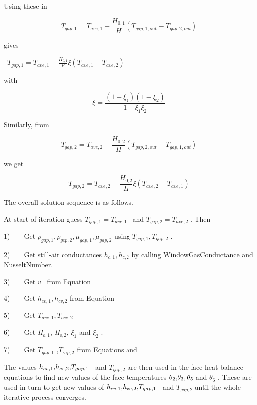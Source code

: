 Using these in

\begin{equation}
{T_{gap,1}} = {T_{ave,1}} - \frac{{{H_{0,1}}}}{H}\left( {{T_{gap,1,out}} - {T_{gap,2,out}}} \right)
\end{equation}

gives

~\({T_{gap,1}} = {T_{ave,1}} - \frac{{{H_{0,1}}}}{H}\xi \left( {{T_{ave,1}} - {T_{ave,2}}} \right)\)

with

\begin{equation}
\xi  = \frac{{(1 - {\xi_1})(1 - {\xi_2})}}{{1 - {\xi_1}{\xi_2}}}
\end{equation}

Similarly, from

\begin{equation}
{T_{gap,2}} = {T_{ave,2}} - \frac{{{H_{0,2}}}}{H}\left( {{T_{gap,2,out}} - {T_{gap,1,out}}} \right)
\end{equation}

we get

\begin{equation}
{T_{gap,2}} = {T_{ave,2}} - \frac{{{H_{0,2}}}}{H}\xi \left( {{T_{ave,2}} - {T_{ave,1}}} \right)
\end{equation}

The overall solution sequence is as follows.

At start of iteration guess \({T_{gap,1}} = {T_{ave,1}}\) ~and \({T_{gap,2}} = {T_{ave,2}}\) . Then

1)~~~~Get \({\rho_{gap,1}},{\rho_{gap,2}},{\mu_{gap,1}},{\mu_{gap,2}}\) using \({T_{gap,1}},{T_{gap,2}}\) .

2)~~~~Get still-air conductances \({h_{c,1}},{h_{c,2}}\) by calling WindowGasConductance and NusseltNumber.

3)~~~~Get \(v\) ~from Equation

4)~~~~Get \({h_{cv,1}},{h_{cv,2}}\) from Equation

5)~~~~Get \({T_{ave,1}},{T_{ave,2}}\)

6)~~~~Get \emph{H\(_{o,1}\)}, \emph{H\(_{o,2}\)}, \({\xi_1}\) and \({\xi_2}\) .

7)~~~~Get \({T_{gap,1}}\) ,\({T_{gap,2}}\) from Equations and

The values \({h_{cv,1}}{\rm{, }}{h_{cv,2}}{\rm{, }}{T_{gap,1}}\) ~and \({T_{gap,2}}\) are then used in the face heat balance equations to find new values of the face temperatures \({\theta_2}{\rm{, }}{\theta_3},{\rm{ }}{\theta_5}\) and \({\theta_6}\) . These are used in turn to get new values of \({h_{cv,1}}{\rm{, }}{h_{cv,2}}{\rm{, }}{T_{gap,1}}\) ~and \({T_{gap,2}}\) until the whole iterative process converges.

